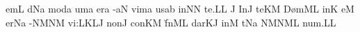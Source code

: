 \spatium
{}em\punctum L\egn
\sgn {}{\a}d\epiphonus Na\egn
\sgn mod\punctum a\egn
\sgn {}um\punctum a\egn
\spatium
{}er\punctum a\egn
\sgn {}{\a}-\clivis aN\egn
\sgn vim\punctum a\egn
\sgn {}us\pes ab\egn
\spatium
\sgn {}in\punctum N\augmentum N\egn
\spatium
\sgn te.\punctum L\augmentum L\egn
\spatium
\divisiofinalis
\spatium\custos J\lineaproxima
\sgn {}In\punctum J\egn
\spatium
\sgn te{}\pes KM\egn
\spatium
\sgn D{\o}m\clivis ML\egn
\sgn {}in\punctum K\egn
\sgn {}e{}\punctum M\egn
\spatium
{}er\pes Na\egn
\sgn {}{\a}-\clivis NM\clivis NM\egn
\sgn vi:\clivis LK\augmentumduplex LJ\egn
\spatium
\divisiominor
\spatium
\sgn non\punctum J\egn
\spatium
\sgn con\pes KM\egn
\sgn f{\u}n\clivis ML\egn
\sgn dar\clivis KJ\egn
\spatium
\sgn {}in\punctum M\egn
\spatium
\sgn {}{\ae}t\pes Na\egn
{}\clivis NM\climacus NML\egn
\sgn nu{m.}\punctum L\augmentum L\egn
\spatium
\Finisgregoriana

\bigskip

















